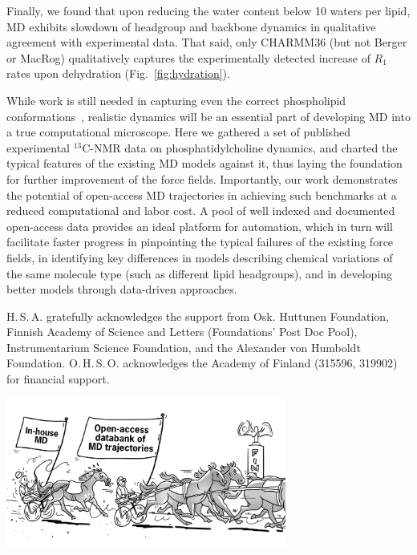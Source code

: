 \documentclass[journal=jcisd8,manuscript=article,layout=twocolumn]{achemso}
\begin{document}
Finally, we found that
upon reducing the water content below 10 waters per lipid, MD exhibits slowdown of headgroup and backbone dynamics  in qualitative agreement with experimental data. That said, only CHARMM36
(but not Berger or MacRog)
qualitatively captures the experimentally detected increase of $R_1$ rates upon dehydration (Fig.~\ref{fig:hydration}).

While work is still needed in capturing even the correct phospholipid conformations~\cite{botan15}, realistic dynamics will be an essential part of developing MD into a true computational microscope.
Here we gathered a set of published experimental $^{13}$C-NMR data on phosphatidylcholine dynamics, and charted the typical features of the existing MD models against it, thus laying the foundation for further improvement of the force fields. 
%
Importantly, our work demonstrates the potential of open-access MD trajectories in achieving such benchmarks at a reduced computational and labor cost. A pool of well indexed and documented open-access data provides an ideal platform for automation, which in turn will facilitate faster progress
in pinpointing the typical failures of the existing force fields,
in identifying key differences in models describing chemical variations of the same molecule type (such as different lipid headgroups), and
in developing better models through data-driven approaches.


\acknowledgement
H.\,S.\,A. gratefully acknowledges the support from Osk. Huttunen Foundation, Finnish Academy of Science and Letters (Foundations’ Post Doc Pool), Instrumentarium Science Foundation, and the Alexander von Humboldt Foundation.
O.\,H.\,S.\,O. acknowledges the Academy of Finland (315596, 319902) for financial support.


\begin{tocentry}
  \vspace{-10mm}
  \hspace{-2mm}
  \includegraphics[width=92mm]{../Figs/Markus_TOC_975x525px_1120_v1.png}
\end{tocentry}
\end{document}
